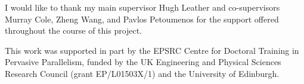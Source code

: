 I would like to thank my main supervisor Hugh Leather and co-supervisors Murray Cole, Zheng Wang, and Pavlos Petoumenos
for the support offered throughout the course of this project.

This work was supported in part by the EPSRC Centre for Doctoral Training in Pervasive Parallelism, funded by the UK Engineering and Physical Sciences Research Council (grant EP/L01503X/1) and the University of Edinburgh.
